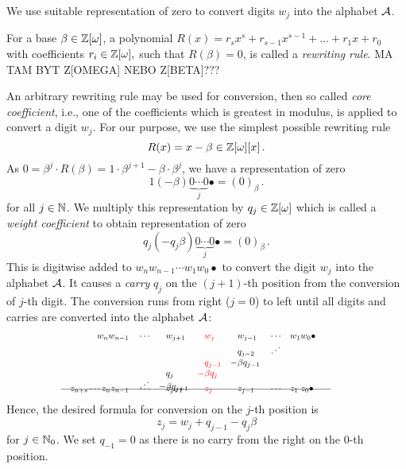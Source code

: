   We use suitable representation of zero to convert digits $w_j$ into the alphabet $\mathcal{A}$. 
  \begin{defn}
  For a base $\beta \in \mathbb{Z}[\omega]$, a polynomial $R(x)=r_s x^s+r_{s-1}x^{s-1}+ \dots + r_1 x+r_0$ with coefficients $r_i \in \mathbb{Z}[\omega],$ such that $R(\beta)=0$, is called a \emph{rewriting rule}. MA TAM BYT Z[OMEGA] NEBO Z[BETA]???
  \end{defn}  
  
  An arbitrary rewriting rule may be used for conversion, then so called \emph{core coefficient}, i.e., one of the coefficients which is greatest in modulus, is applied to convert a digit $w_j$. For our purpose, we use the simplest possible rewriting rule
  $$
    R(x)=x-\beta \in \mathbb{Z}[\omega][x]\,.
  $$
As $0=\beta^{j} \cdot R(\beta)=1\cdot \beta^{j+1} -\beta \cdot \beta^{j}$, we have a representation of zero 
$$1 (-\!\beta) \underbrace{0 \cdots 0}_{j}\bullet = (0)_\beta\,. $$
for all $j \in \mathbb{N}$. We multiply this representation by $q_j \in \mathbb{Z}[\omega]$ which is called a \emph{weight coefficient} to obtain representation of zero 
$$q_j (-q_j\beta) \underbrace{0 \cdots 0}_{j}\bullet = (0)_\beta\,. $$ 
This is digitwise added to $w_{n} w_{n-1}\cdots w_1 w_0 \bullet$ to convert the digit $w_j$ into the alphabet $\mathcal{A}$. It causes a \emph{carry} $q_{j}$ on the $(j+1)$-th position from the conversion of $j$-th digit. The conversion runs from right ($j=0$) to left until all digits and carries are converted into the alphabet $\mathcal{A}$:
        \begin{align*}
            \hspace{100pt}  w_n w_{n-1}&&&\cdots& &w_{j+1}&\!\! &\textcolor{red}{w_j}  & \!\!  &w_{j-1} &&\cdots &&w_1 w_0\bullet \hspace{100pt} \\[-5pt]
                         &&&&       &       & &     &   &q_{j-2} &&\iddots\\[-3pt] 
                         &&&&       &       & &\textcolor{red}{q_{j-1}}& -&\beta q_{j-1} \\[-3pt]
                         &&&&         &q_j&   \textcolor{red}{-}&\textcolor{red}{\beta q_j} &&\\[-8pt]
                         &&&  \iddots      &   -&\beta q_{j+1}&   &\ &&\\[-17pt]
          \intertext{\hspace{60pt}\line(1,0){300}}
          \vspace{-15pt}
          \\[-30pt]
           z_{n+s} \cdots z_{n} z_{n-1}&&&\cdots& &z_{j+1}& &\textcolor{red}{z_j}& &z_{j-1} &&\cdots &&z_1 \; z_0\bullet                  
        \end{align*}
    Hence, the desired formula for conversion on the $j$-th position is 
    \begin{equation*}
        z_j=w_j + q_{j-1} - q_j \beta
    \end{equation*}
    for $j \in \mathbb{N}_0$. We set $q_{-1}=0$ as there is no carry from the right on the 0-th position.
    
